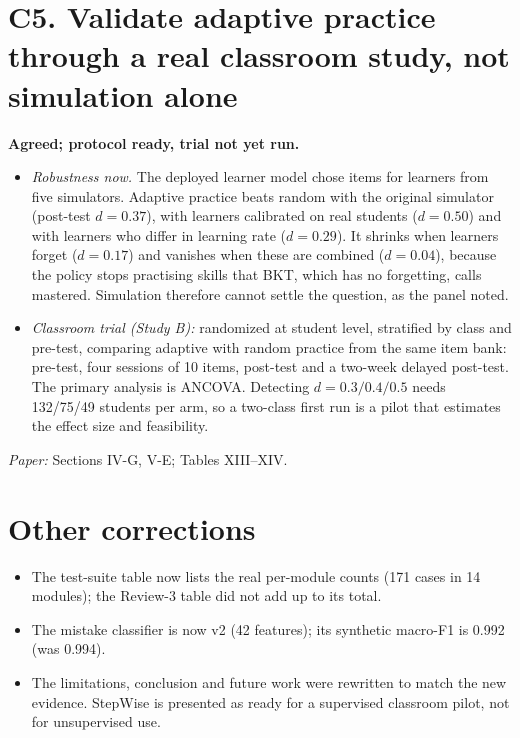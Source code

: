 \documentclass[10pt]{article}
\begin{document}
\section*{C5. Validate adaptive practice through a real classroom study, not simulation alone}
\textbf{Agreed; protocol ready, trial not yet run.}
\begin{itemize}
\item \textit{Robustness now.} The deployed learner model chose items for learners from five simulators. Adaptive practice beats random with the original simulator (post-test $d=0.37$), with learners calibrated on real students ($d=0.50$) and with learners who differ in learning rate ($d=0.29$). It shrinks when learners forget ($d=0.17$) and vanishes when these are combined ($d=0.04$), because the policy stops practising skills that BKT, which has no forgetting, calls mastered. Simulation therefore cannot settle the question, as the panel noted.
\item \textit{Classroom trial (Study B):} randomized at student level, stratified by class and
pre-test, comparing adaptive with random practice from the same item bank: pre-test, four sessions
of 10 items, post-test and a two-week delayed post-test. The primary analysis is ANCOVA. Detecting
$d=0.3/0.4/0.5$ needs 132/75/49 students per arm, so a two-class first run is a pilot that estimates
the effect size and feasibility.
\end{itemize}
\textit{Paper:} Sections IV-G, V-E; Tables XIII--XIV.

\section*{Other corrections}
\begin{itemize}
\item The test-suite table now lists the real per-module counts (171 cases in 14 modules); the
Review-3 table did not add up to its total.
\item The mistake classifier is now v2 (42 features); its synthetic macro-F1 is 0.992 (was 0.994).
\item The limitations, conclusion and future work were rewritten to match the new evidence. StepWise
is presented as ready for a supervised classroom pilot, not for unsupervised use.
\end{itemize}
\end{document}

